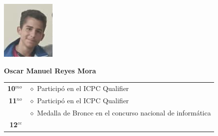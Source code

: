\begin{minipage}{0.2\textwidth}
	\includegraphics[width=\linewidth]{img/concursantes/oscar.png} %
\end{minipage}
\hfill
\begin{minipage}{0.7\textwidth}
	\textbf{Oscar Manuel Reyes Mora}
	
	\vspace*{0.1in}
	\begin{tabular}{rl}
		
		\textbf{10$^{mo}$} & $\diamond$ Participó en el ICPC Qualifier \\
		
		\textbf{11$^{no}$} 
		& $\diamond$ Participó en el ICPC Qualifier \\
		& $\diamond$ Medalla de Bronce en el concurso nacional de informática \\
		
		
		\textbf{12$^{ce}$} &   \\
	\end{tabular}
\end{minipage}

